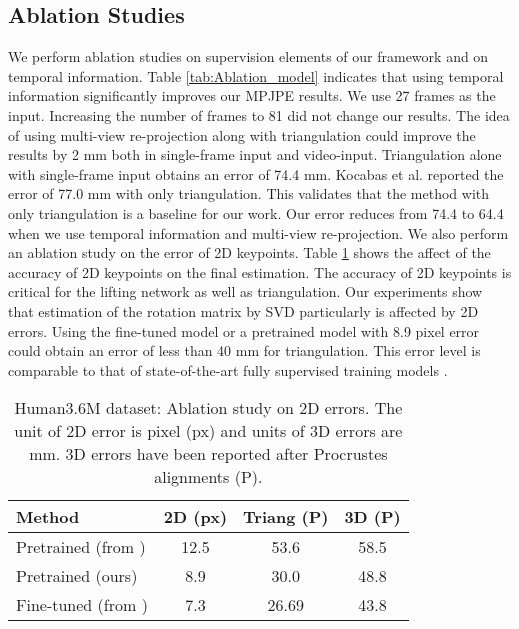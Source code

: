 \documentclass[10pt,twocolumn,letterpaper]{article}
\begin{document}
\subsection{Ablation Studies}
We perform ablation studies on supervision elements of our framework and on temporal information. Table \ref{tab:Ablation_model} indicates that using temporal information significantly improves our MPJPE results. We use 27 frames as the input. Increasing the number of frames to 81 did not change our results. The idea of using multi-view re-projection along with triangulation could improve the results by 2 mm both in single-frame input and video-input. Triangulation alone with single-frame input obtains an error of 74.4 mm. Kocabas et al. \cite{Kocabas_2019_CVPR} reported the error of 77.0 mm with only triangulation. This validates that the method with only triangulation is a baseline for our work. Our error reduces from 74.4 to 64.4 when we use temporal information and multi-view re-projection.
We also perform an ablation study on the error of 2D keypoints. Table \ref{tab:Ablation_2D} shows the affect of the accuracy of 2D keypoints on the final estimation. The accuracy of 2D keypoints is critical for the lifting network as well as triangulation. Our experiments show that estimation of the rotation matrix by SVD particularly is affected by 2D errors. Using the fine-tuned model or a pretrained model with 8.9 pixel error \cite{Iqbal_2020_CVPR} could obtain an error of less than 40 mm for triangulation. This error level is comparable to that of state-of-the-art fully supervised training models \cite{Chen_2019_CVPR}.       
{\renewcommand{\arraystretch}{1}
\begin{table}[b]
\footnotesize
\centering
\caption{Human3.6M dataset: Ablation study on 2D errors. The unit of 2D error is pixel (px) and units of 3D errors are mm. 3D errors have been reported after Procrustes alignments (P).}
\label{tab:Ablation_2D}
\begin{tabular}{ p{3cm} |c c c}
\hline
Method & 2D (px) & Triang (P) & 3D (P)  \\
\hline
Pretrained (from \cite{Martinez_2017_ICCV})
& 12.5 &  53.6 & 58.5  \\
Pretrained (ours)
& 8.9 & 30.0 &48.8 \\
Fine-tuned (from \cite{Pavllo_2019_CVPR})
& 7.3  & 26.69 & 43.8  \\ \hline
\end{tabular}
\end{table}}
\end{document}
